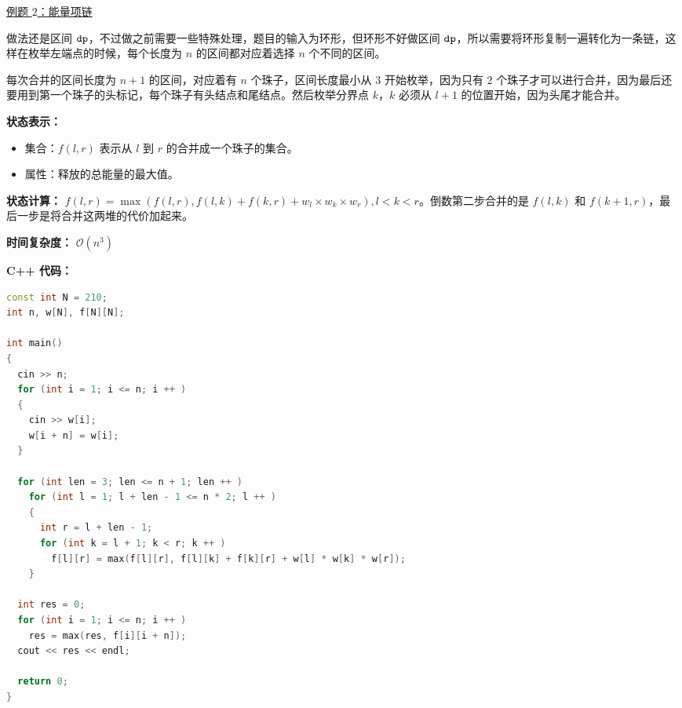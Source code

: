 \href{https://www.luogu.com.cn/problem/P1063}{例题 $2$：能量项链}

做法还是区间 $\tt dp$，不过做之前需要一些特殊处理，题目的输入为环形，但环形不好做区间 $\tt dp$，所以需要将环形复制一遍转化为一条链，这样在枚举左端点的时候，每个长度为 $n$ 的区间都对应着选择 $n$ 个不同的区间。

每次合并的区间长度为 $n + 1$ 的区间，对应着有 $n$ 个珠子，区间长度最小从 $3$ 开始枚举，因为只有 $2$ 个珠子才可以进行合并，因为最后还要用到第一个珠子的头标记，每个珠子有头结点和尾结点。然后枚举分界点 $k$，$k$ 必须从 $l + 1$ 的位置开始，因为头尾才能合并。

\textbf{状态表示：}
\begin{itemize}
\item 集合：$f(l, r)$ 表示从 $l$ 到 $r$ 的合并成一个珠子的集合。
\item 属性：释放的总能量的最大值。
\end{itemize}

\textbf{状态计算：} $f(l, r) = \max(f(l, r), f(l, k) + f(k, r) + w_l \times w_k \times w_r), l < k < r$。倒数第二步合并的是 $f(l, k)$ 和 $f(k + 1, r)$，最后一步是将合并这两堆的代价加起来。

\textbf{时间复杂度：} $\mathcal{O}(n^3)$

\textbf{C++ 代码：}

\begin{lstlisting}[language=cpp]
const int N = 210;
int n, w[N], f[N][N];

int main()
{
  cin >> n;
  for (int i = 1; i <= n; i ++ )
  {
    cin >> w[i];
    w[i + n] = w[i];
  }
  
  for (int len = 3; len <= n + 1; len ++ )
    for (int l = 1; l + len - 1 <= n * 2; l ++ )
    {
      int r = l + len - 1;
      for (int k = l + 1; k < r; k ++ )
        f[l][r] = max(f[l][r], f[l][k] + f[k][r] + w[l] * w[k] * w[r]);
    }
  
  int res = 0;
  for (int i = 1; i <= n; i ++ )
    res = max(res, f[i][i + n]);
  cout << res << endl;

  return 0;
}
\end{lstlisting}

